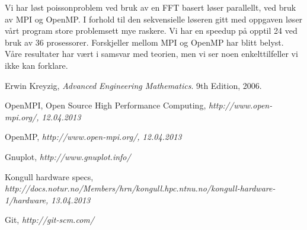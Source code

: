 \documentclass[11pt,norsk,a4paper]{article}
\begin{document}
Vi har løst poissonproblem ved bruk av en FFT basert løser parallellt, ved bruk av MPI og OpenMP. I forhold til den sekvensielle løseren gitt med oppgaven løser vårt program store problemsett mye raskere. Vi har en speedup på opptil 24 ved bruk av 36 prosessorer. Forskjeller mellom MPI og OpenMP har blitt belyst. Våre resultater har vært i samsvar med teorien, men vi ser noen enkelttilfeller vi ikke kan forklare.




\begin{thebibliography}{99}

Erwin Kreyzig,
\emph{Advanced Engineering Mathematics}.
9th Edition,
2006.

OpenMPI, Open Source High Performance Computing, \it{http://www.open-mpi.org/}, 12.04.2013

OpenMP, \it{http://www.open-mpi.org/}, 12.04.2013

Gnuplot, \it{http://www.gnuplot.info/}

Kongull hardware specs, \it{http://docs.notur.no/Members/hrn/kongull.hpc.ntnu.no/kongull-hardware-1/hardware}, 13.04.2013

Git, \it{http://git-scm.com/}

\end{thebibliography}

\listoffigures
\end{document}

